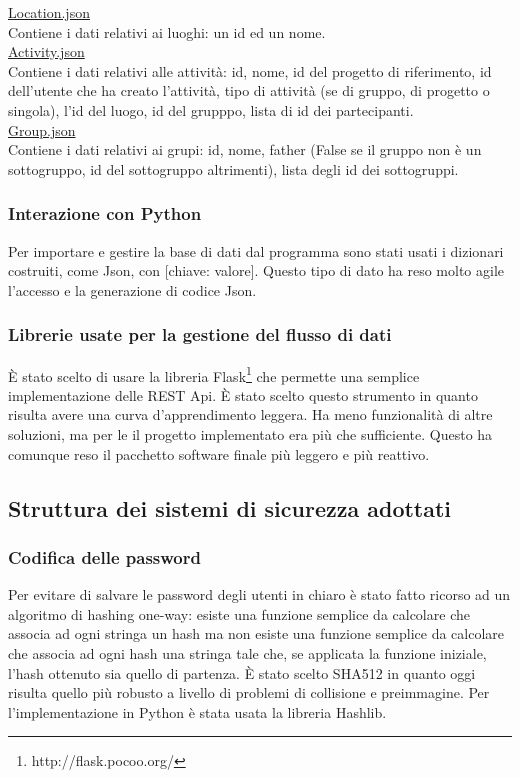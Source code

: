 \documentclass[12pt]{scrartcl}
\begin{document}
    \underline{Location.json}\\
        Contiene i dati relativi ai luoghi: un id ed un nome.\\
    
    \underline{Activity.json}\\
        Contiene i dati relativi alle attivit\`a: id, nome, id del progetto di riferimento, 
        id dell'utente che ha creato l'attivit\`a, tipo di attivit\`a (se di gruppo, di progetto
        o singola), l'id del luogo, id del grupppo, lista di id dei partecipanti.\\
    
    \underline{Group.json}\\
        Contiene i dati relativi ai grupi: id, nome, father (False se il gruppo non \`e un sottogruppo,
        id del sottogruppo altrimenti), lista degli id dei sottogruppi.\\
        
\subsubsection{Interazione con Python}
    Per importare e gestire la base di dati dal programma sono stati usati i dizionari costruiti,
    come Json, con [chiave: valore]. Questo tipo di dato ha reso molto agile
    l'accesso e la generazione di codice Json.

\subsubsection{Librerie usate per la gestione del flusso di dati}
\`E stato scelto di usare la libreria Flask\footnote{http://flask.pocoo.org/} che permette
una semplice implementazione delle REST Api. \`E stato scelto questo strumento in quanto
risulta avere una curva d'apprendimento leggera. Ha meno funzionalit\`a di altre soluzioni,
ma per le il progetto implementato era pi\`u che sufficiente. Questo ha comunque reso
il pacchetto software finale pi\`u leggero e pi\`u reattivo.

\subsection{Struttura dei sistemi di sicurezza adottati}
\subsubsection{Codifica delle password}
    Per evitare di salvare le password degli utenti in chiaro
    \`e stato fatto ricorso ad un algoritmo di hashing one-way:
    esiste una funzione semplice da calcolare che associa ad ogni stringa un hash
    ma non esiste una funzione semplice da calcolare che associa ad ogni hash una stringa
    tale che, se applicata la funzione iniziale, l'hash ottenuto sia quello di partenza.
    \`E stato scelto SHA512 in quanto oggi risulta quello pi\`u robusto a 
    livello di problemi di collisione e preimmagine. Per l'implementazione in Python
    \`e stata usata la libreria Hashlib.
\end{document}
